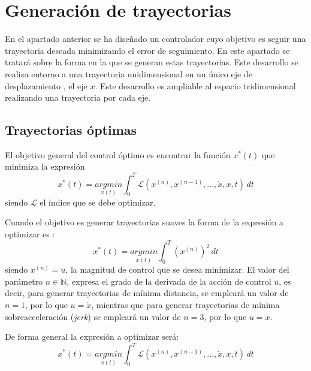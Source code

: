 \chapter{Generación de trayectorias}\label{cap:gen_tray}

En el apartado anterior se ha diseñado un controlador cuyo objetivo es seguir una trayectoria deseada minimizando el error de seguimiento. En este apartado se tratará sobre la forma en la que se generan estas trayectorias. Este desarrollo se realiza entorno a una trayectoria unidimensional en un único eje de desplazamiento , el eje $x$. Este desarrollo es ampliable al espacio tridimensional realizando una trayectoria por cada eje.


\section{Trayectorias óptimas}\label{trajectoriasoptimas:cap}
El objetivo general del control óptimo es encontrar la función $x^*(t)$ que minimiza la expresión
\begin{equation}
	x^*(t) =  \underset{x(t)}{argmin}\int_{0}^{T}\mathcal{L}\left(x^{(n)},x^{(n-1)},...,\dot{x},x,t\right)\, dt
\end{equation}
siendo $\mathcal{L}$ el índice que se debe optimizar.

Cuando el objetivo es generar trayectorias suaves la forma de la expresión a optimizar es :
\begin{equation}
	x^*(t) = \underset{x(t)}{argmin}\int_{0}^{T}\left(x^{(n)}\right)^2\, dt
\end{equation}
siendo $x^{(n)} = u $, la magnitud de control que se desea minimizar. El valor del parámetro $n\in\mathbb{N}$, expresa el grado de la derivada de la acción de control $u$, es decir, para generar trayectorias de mínima distancia, se empleará un valor de $n=1$, por lo que $u = \dot{x}$, mientras que para generar trayectorias de mínima sobreacceleración (\textit{jerk}) se empleará un valor de $n=3$, por lo que $u = \dddot{x}$.

De forma general la expresión a optimizar será:
	\begin{equation}
		x^*(t) = \underset{x(t)}{argmin}\int_{0}^{T}\mathcal{L}\left(x^{(n)}, x^{(n-1)},...,\dot{x},x,t\right)\, dt
	\end{equation}

